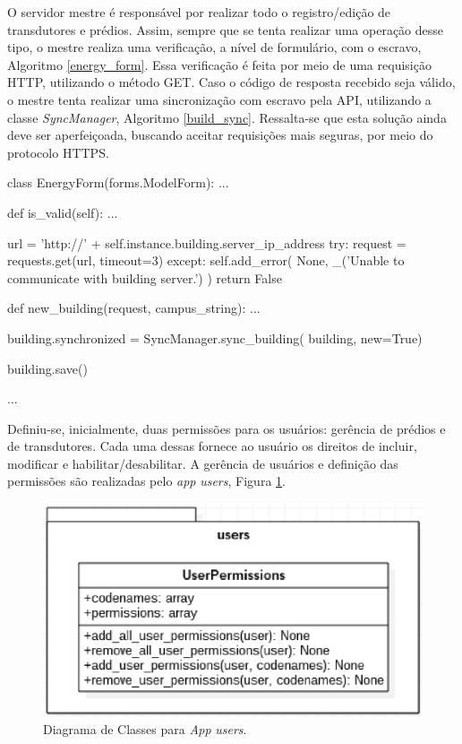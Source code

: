 O servidor mestre é responsável por realizar todo o registro/edição de transdutores e prédios. Assim, sempre que se tenta realizar uma operação desse tipo, o mestre realiza uma verificação, a nível de formulário, com o escravo, Algoritmo \ref{energy_form}. Essa verificação é feita por meio de uma requisição HTTP, utilizando o método GET. Caso o código de resposta recebido seja válido, o mestre tenta realizar uma sincronização com escravo pela API, utilizando a classe \textit{SyncManager}, Algoritmo \ref{build_sync}. Ressalta-se que esta solução ainda deve ser aperfeiçoada, buscando aceitar requisições mais seguras, por meio do protocolo HTTPS.

\begin{python}[caption={Corpo do método \textit{is\_valid}, classe \textit{EnergyForm}.}, captionpos=b, label={energy_form}]
class EnergyForm(forms.ModelForm):
    ...

    def is_valid(self):
        ...

        url = 'http://' + self.instance.building.server_ip_address
        try:
            request = requests.get(url, timeout=3)
        except:
            self.add_error(
                None,
                _('Unable to communicate with building server.')
            )
            return False
\end{python}

\begin{python}[caption={Sincronização realizada durante a criação de um prédio.}, captionpos=b, label={build_sync}]
def new_building(request, campus_string):
    ...

    building.synchronized = SyncManager.sync_building(
        building, new=True)

    building.save()

    ...
\end{python}

Definiu-se, inicialmente, duas permissões para os usuários: gerência de prédios e de transdutores. Cada uma dessas fornece ao usuário os direitos de incluir, modificar e habilitar/desabilitar. A gerência de usuários e definição das permissões são realizadas pelo \textit{app} \textit{users}, Figura \ref{app_users}.

\begin{figure}[!h]
    \centering
    \includegraphics[keepaspectratio=true,scale=0.8]{figuras/app_users.eps}
    \caption{Diagrama de Classes para \textit{App} \textit{users}.}
    \label{app_users}
\end{figure}

